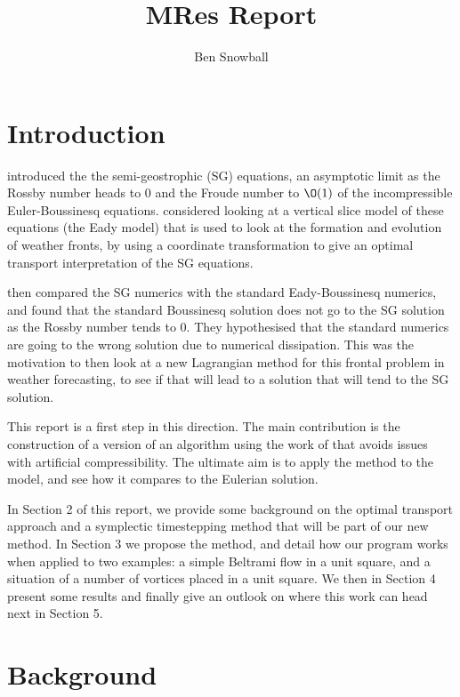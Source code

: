 \documentclass[11pt, oneside]{article}   	%
\title{MRes Report}
\author{Ben Snowball}
\begin{document}
\maketitle
\section{Introduction}

\cite{hoskins1971atmospheric} introduced the the semi-geostrophic (SG) equations, an asymptotic limit as the Rossby number heads to \(0\) and the Froude number to \(\O(1)\) of the incompressible Euler-Boussinesq equations. \cite{cullen2006mathematical} considered looking at a vertical slice model of these equations (the Eady model) that is used to look at the formation and evolution of weather fronts, by using a coordinate transformation to give an optimal transport interpretation of the SG equations.

\cite{visram2014framework} then compared the SG numerics with the standard Eady-Boussinesq numerics, and found that the standard Boussinesq solution does not go to the SG solution as the Rossby number tends to \(0\). They hypothesised that the standard numerics are going to the wrong solution due to numerical dissipation. This was the motivation to then look at a new Lagrangian method for this frontal problem in weather forecasting, to see if that will lead to a solution that will tend to the SG solution. 

This report is a first step in this direction. The main contribution is the construction of a version of an algorithm using the work of \cite{gallouet2016lagrangian} that avoids issues with artificial compressibility. The ultimate aim is to apply the method to the model, and see how it compares to the Eulerian solution.

In Section 2 of this report, we provide some background on the optimal transport approach and a symplectic timestepping method that will be part of our new method. In Section 3 we propose the method, and detail how our program works when applied to two examples: a simple Beltrami flow in a unit square, and a situation of a number of vortices placed in a unit square. We then in Section 4 present some results and finally give an outlook on where this work can head next in Section 5.


\section{Background}
\end{document}

